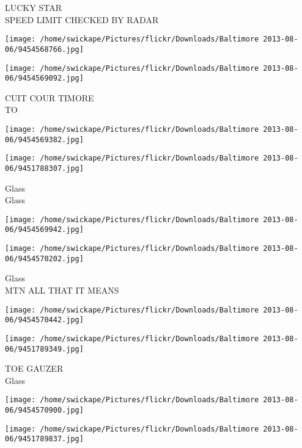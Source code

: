 \documentclass[10pt,letterpaper]{article}
\begin{document}
LUCKY STAR\\
SPEED LIMIT CHECKED BY RADAR\\
\pagebreak

\texttt{[image: /home/swickape/Pictures/flickr/Downloads/Baltimore 2013-08-06/9454568766.jpg]}

\vspace{0.25in}
\texttt{[image: /home/swickape/Pictures/flickr/Downloads/Baltimore 2013-08-06/9454569092.jpg]}

CUIT COUR TIMORE\\
TO\\
\pagebreak

\texttt{[image: /home/swickape/Pictures/flickr/Downloads/Baltimore 2013-08-06/9454569382.jpg]}

\vspace{0.25in}
\texttt{[image: /home/swickape/Pictures/flickr/Downloads/Baltimore 2013-08-06/9451788307.jpg]}

Glass\\
Glass\\
\pagebreak

\texttt{[image: /home/swickape/Pictures/flickr/Downloads/Baltimore 2013-08-06/9454569942.jpg]}

\vspace{0.25in}
\texttt{[image: /home/swickape/Pictures/flickr/Downloads/Baltimore 2013-08-06/9454570202.jpg]}

Glass\\
MTN ALL THAT IT MEANS\\
\pagebreak

\texttt{[image: /home/swickape/Pictures/flickr/Downloads/Baltimore 2013-08-06/9454570442.jpg]}

\vspace{0.25in}
\texttt{[image: /home/swickape/Pictures/flickr/Downloads/Baltimore 2013-08-06/9451789349.jpg]}

TOE GAUZER\\
Glass\\
\pagebreak

\texttt{[image: /home/swickape/Pictures/flickr/Downloads/Baltimore 2013-08-06/9454570900.jpg]}

\vspace{0.25in}
\texttt{[image: /home/swickape/Pictures/flickr/Downloads/Baltimore 2013-08-06/9451789837.jpg]}
\end{document}
